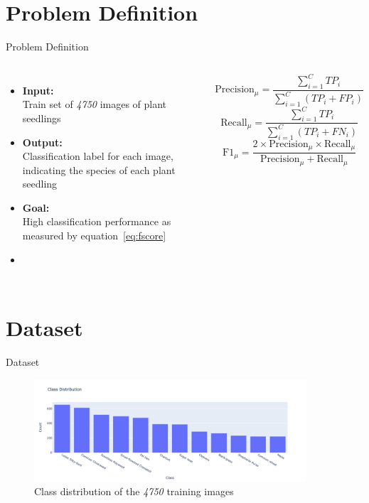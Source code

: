 \documentclass{beamer}
\begin{document}
\section{Problem Definition}
\begin{frame}{Problem Definition}
    \begin{columns}
        \begin{itemize}
            \item \textbf{Input:\\}Train set of \textit{4750} images of plant seedlings
            \item \textbf{Output:\\}Classification label for each image, indicating the species of each plant seedling
            \item \textbf{Goal:\\}High classification performance as measured by equation~\ref{eq:fscore}
            \item[] \cite{plant-seedlings-classification-evaluation,manning2009introduction,sokolova2009systematic,takahashi2022confidence}
        \end{itemize}
        \begin{equation}
            \text{Precision}_{\mu} = \frac{\sum_{i=1}^{C} \mathit{TP_i}}{\sum_{i=1}^{C} (\mathit{TP_i} + \mathit{FP_i})}\label{eq:precision}
        \end{equation}
        \begin{equation}
            \text{Recall}_{\mu} = \frac{\sum_{i=1}^{C}  \mathit{TP_i}}{\sum_{i=1}^{C} (\mathit{TP_i} + \mathit{FN_i})}\label{eq:recall}
        \end{equation}
        \begin{equation}
            \text{F1}_{\mu} = \frac{2 \times \text{Precision}_{\mu} \times \text{Recall}_{\mu}}{\text{Precision}_{\mu} + \text{Recall}_{\mu}}\label{eq:fscore}
        \end{equation}
    \end{columns}
\end{frame}

\section{Dataset}
\begin{frame}{Dataset}
    \begin{figure}
        \centering
        \includegraphics[width=0.9\textwidth]{../resources/class_distribution.png}
        \caption{Class distribution of the \textit{4750} training images}\label{fig:class-distribution}
    \end{figure}
\end{frame}
\end{document}

